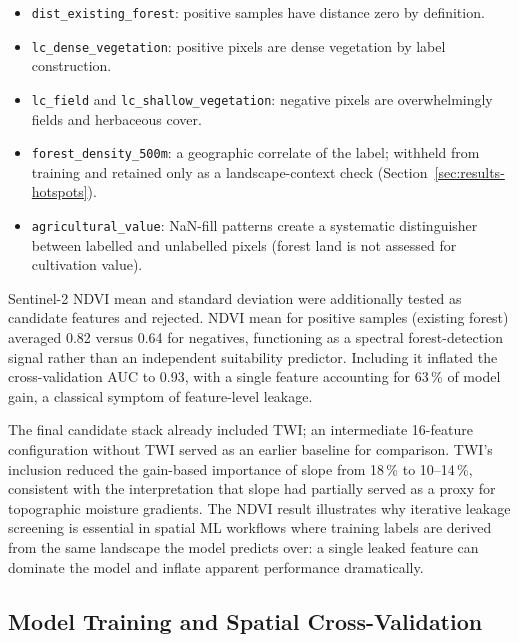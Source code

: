 \documentclass[land,article,submit,moreauthors]{Definitions/mdpi}
\begin{document}
\begin{itemize}
    \item \texttt{dist\_existing\_forest}: positive samples have distance zero by definition.
    \item \texttt{lc\_dense\_vegetation}: positive pixels are dense vegetation by label construction.
    \item \texttt{lc\_field} and \texttt{lc\_shallow\_vegetation}: negative pixels are overwhelmingly fields and herbaceous cover.
    \item \texttt{forest\_density\_500m}: a geographic correlate of the label; withheld from training and retained only as a landscape-context check (Section~\ref{sec:results-hotspots}).
    \item \texttt{agricultural\_value}: NaN-fill patterns create a systematic distinguisher between labelled and unlabelled pixels (forest land is not assessed for cultivation value).
\end{itemize}

Sentinel-2 NDVI mean and standard deviation were additionally tested as candidate features and rejected. NDVI mean for positive samples (existing forest) averaged 0.82 versus 0.64 for negatives, functioning as a spectral forest-detection signal rather than an independent suitability predictor. Including it inflated the cross-validation AUC to 0.93, with a single feature accounting for 63\,\% of model gain, a classical symptom of feature-level leakage.

The final candidate stack already included TWI; an intermediate 16-feature configuration without TWI served as an earlier baseline for comparison. TWI's inclusion reduced the gain-based importance of slope from 18\,\% to 10--14\,\%, consistent with the interpretation that slope had partially served as a proxy for topographic moisture gradients. The NDVI result illustrates why iterative leakage screening is essential in spatial ML workflows where training labels are derived from the same landscape the model predicts over: a single leaked feature can dominate the model and inflate apparent performance dramatically.

\subsection{Model Training and Spatial Cross-Validation}
\label{sec:models}
\end{document}
